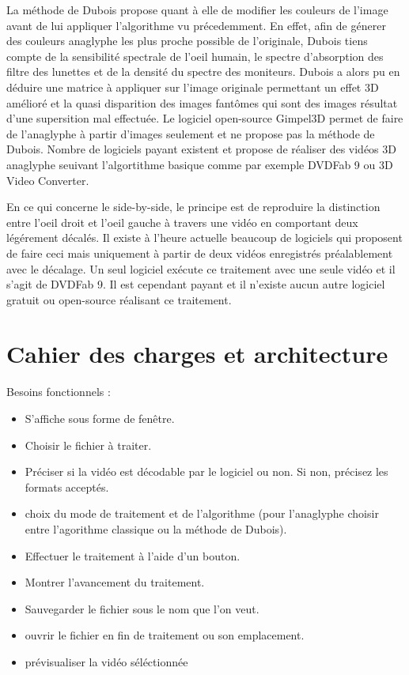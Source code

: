 \documentclass[10pt,a4paper]{article}
\begin{document}
La méthode de Dubois propose quant à elle de modifier les couleurs de l'image avant de lui appliquer l'algorithme vu précedemment.
En effet, afin de génerer des couleurs anaglyphe les plus proche possible de l'originale, Dubois tiens compte de la sensibilité spectrale de l'oeil humain,
le spectre d'absorption des filtre des lunettes et de la densité du spectre des moniteurs.
Dubois a alors pu en déduire une matrice à appliquer sur l'image originale permettant un effet 3D amélioré et la quasi
disparition des images fantômes qui sont des images résultat d'une supersition mal effectuée.
Le logiciel open-source Gimpel3D permet de faire de l'anaglyphe à partir d'images seulement et ne propose pas la méthode de Dubois. Nombre de logiciels payant existent et propose de réaliser des vidéos 3D
anaglyphe seuivant l'algortithme basique comme par exemple DVDFab 9 ou  3D Video Converter.

En ce qui concerne le side-by-side, le principe est de reproduire la distinction entre l'oeil droit et l'oeil gauche à travers une vidéo en comportant deux légérement décalés.
Il existe à l'heure actuelle beaucoup de logiciels qui proposent de faire ceci mais uniquement à partir de deux vidéos enregistrés préalablement avec le décalage.
Un seul logiciel exécute ce traitement avec une seule vidéo et il s'agit de DVDFab 9. Il est cependant payant et il n'existe aucun autre logiciel gratuit ou open-source réalisant ce traitement.

\section{Cahier des charges et architecture}

Besoins fonctionnels :\newline
\begin{itemize}
\item S'affiche sous forme de fenêtre.
\item Choisir le fichier à traiter.
\item Préciser si la vidéo est décodable par le logiciel ou non. Si non, précisez les formats acceptés.
\item choix du mode de traitement et de l'algorithme (pour l'anaglyphe choisir entre l'agorithme classique ou la méthode
de Dubois).
\item Effectuer le traitement à l'aide d'un bouton.
\item Montrer l'avancement du traitement.
\item Sauvegarder le fichier sous le nom que l'on veut.
\item ouvrir le fichier en fin de traitement ou son emplacement.
\item prévisualiser la vidéo séléctionnée\newline
\end{itemize}
\end{document}
